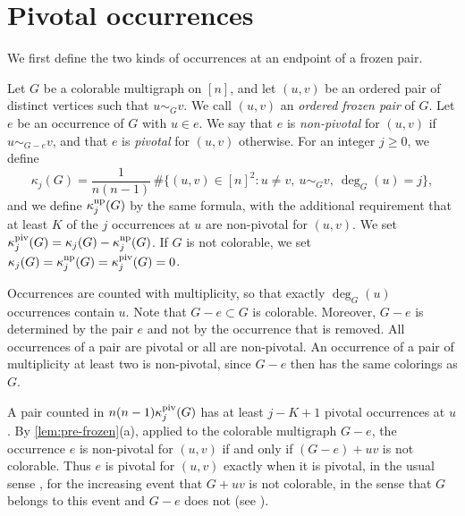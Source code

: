 \section{Pivotal occurrences}\label{sec:high-pivotal}

We first define the two kinds of occurrences at an endpoint of a frozen pair.

\begin{definition}\label{def:high-pivotal}
Let $G$ be a colorable multigraph on $[n]$, and let $(u, v)$ be an ordered pair of distinct vertices such that $u \sim_G v$. We call $(u, v)$ an \emph{ordered frozen pair} of $G$. Let $e$ be an occurrence of $G$ with $u \in e$. We say that $e$ is \emph{non-pivotal} for $(u, v)$ if $u \sim_{G - e} v$, and that $e$ is \emph{pivotal} for $(u, v)$ otherwise. For an integer $j \ge 0$, we define
\begin{equation}\label{eq:high-kappaj}
\kappa_j(G) = \frac{1}{n(n - 1)} \, \# \bigl\{ (u, v) \in [n]^2 : u \ne v, \ u \sim_G v, \ \deg_G(u) = j \bigr\},
\end{equation}
and we define $\kappa_j^{\rm np}(G)$ by the same formula, with the additional requirement that at least $K$ of the $j$ occurrences at $u$ are non-pivotal for $(u, v)$. We set $\kappa_j^{\rm piv}(G) = \kappa_j(G) - \kappa_j^{\rm np}(G)$. If $G$ is not colorable, we set $\kappa_j(G) = \kappa_j^{\rm np}(G) = \kappa_j^{\rm piv}(G) = 0$.
\end{definition}

Occurrences are counted with multiplicity, so that exactly $\deg_G(u)$ occurrences contain $u$. Note that $G - e \subset G$ is colorable. Moreover, $G - e$ is determined by the pair $e$ and not by the occurrence that is removed. All occurrences of a pair are pivotal or all are non-pivotal. An occurrence of a pair of multiplicity at least two is non-pivotal, since $G - e$ then has the same colorings as $G$.

A pair counted in $n(n - 1) \kappa_j^{\rm piv}(G)$ has at least $j - K + 1$ pivotal occurrences at $u$. By \cref{lem:pre-frozen}(a), applied to the colorable multigraph $G - e$, the occurrence $e$ is non-pivotal for $(u, v)$ if and only if $(G - e) + uv$ is not colorable. Thus $e$ is pivotal for $(u, v)$ exactly when it is pivotal, in the usual sense \cite[Section~2, p.~130]{russo1982approximate}, for the increasing event that $G + uv$ is not colorable, in the sense that $G$ belongs to this event and $G - e$ does not (see \cite[Section~4.8, Exercise~4.9]{grimmett2018probability}).

